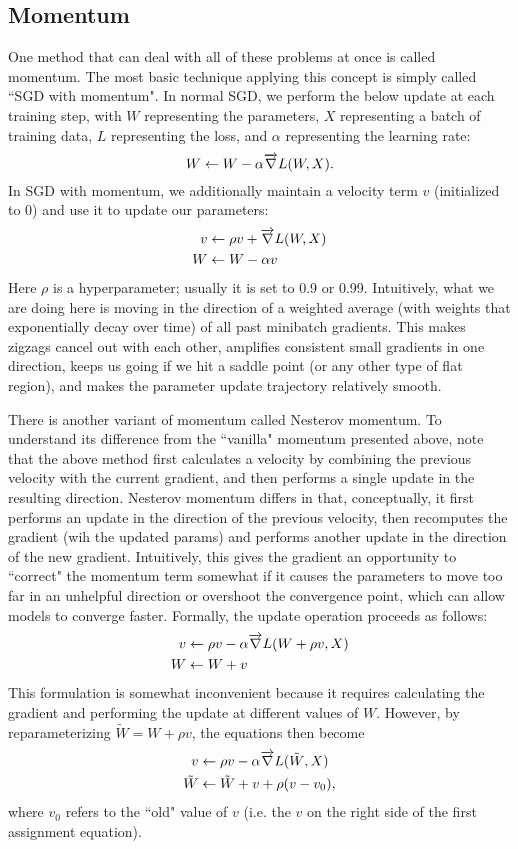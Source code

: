 \subsection{Momentum}
One method that can deal with all of these problems at once is called momentum. The most basic technique applying this concept is simply called ``SGD with momentum". In normal SGD, we perform the below update at each training step, with $W$ representing the parameters, $X$ representing a batch of training data, $L$ representing the loss, and $\alpha$ representing the learning rate:
$$W \leftarrow W - \alpha \overrightarrow{\nabla} L(W, X).$$
In SGD with momentum, we additionally maintain a velocity term $v$ (initialized to 0) and use it to update our parameters:
\begin{align*}
v &\leftarrow \rho v + \overrightarrow{\nabla} L(W, X)\\
W &\leftarrow W - \alpha v
\end{align*}
Here $\rho$ is a hyperparameter; usually it is set to 0.9 or 0.99. Intuitively, what we are doing here is moving in the direction of a weighted average (with weights that exponentially decay over time) of all past minibatch gradients. This makes zigzags cancel out with each other, amplifies consistent small gradients in one direction, keeps us going if we hit a saddle point (or any other type of flat region), and makes the parameter update trajectory relatively smooth.

There is another variant of momentum called Nesterov momentum. To understand its difference from the ``vanilla" momentum presented above, note that the above method first calculates a velocity by combining the previous velocity with the current gradient, and then performs a single update in the resulting direction. Nesterov momentum differs in that, conceptually, it first performs an update in the direction of the previous velocity, then recomputes the gradient (wih the updated params) and performs another update in the direction of the new gradient. Intuitively, this gives the gradient an opportunity to ``correct" the momentum term somewhat if it causes the parameters to move too far in an unhelpful direction or overshoot the convergence point, which can allow models to converge faster. Formally, the update operation proceeds as follows:
\begin{align*}
v &\leftarrow \rho v - \alpha \overrightarrow{\nabla} L(W + \rho v, X)\\
W &\leftarrow W + v
\end{align*}
This formulation is somewhat inconvenient because it requires calculating the gradient and performing the update at different values of $W$. However, by reparameterizing $\tilde{W} = W + \rho v$, the equations then become
\begin{align*}
v &\leftarrow \rho v - \alpha \overrightarrow{\nabla} L(\tilde{W}, X)\\
\tilde{W} &\leftarrow \tilde{W} + v + \rho(v - v_0),
\end{align*}
where $v_0$ refers to the ``old" value of $v$ (i.e. the $v$ on the right side of the first assignment equation).

